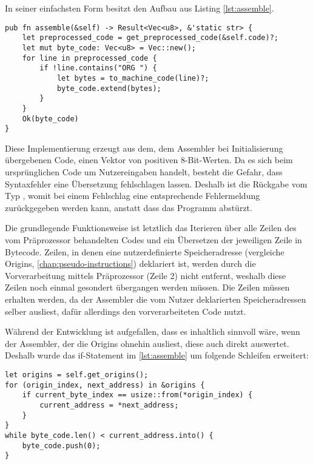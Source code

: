 In seiner einfachsten Form besitzt  den Aufbau aus Listing \ref{lst:assemble}.

\begin{listing}[ht]
\begin{verbatim}
pub fn assemble(&self) -> Result<Vec<u8>, &'static str> {
	let preprocessed_code = get_preprocessed_code(&self.code)?;
	let mut byte_code: Vec<u8> = Vec::new();
    for line in preprocessed_code {
        if !line.contains("ORG ") {
	        let bytes = to_machine_code(line)?;
            byte_code.extend(bytes);
        }
    }
    Ok(byte_code)
}
\end{verbatim}
\label{lst:assemble}
\end{listing}

Diese Implementierung erzeugt aus dem, dem Assembler bei Initialisierung übergebenen Code, einen Vektor von positiven 8-Bit-Werten. Da es sich beim ursprünglichen Code um Nutzereingaben handelt, besteht die Gefahr, dass Syntaxfehler eine Übersetzung fehlschlagen lassen. Deshalb ist die Rückgabe vom Typ , womit bei einem Fehlschlag eine entsprechende Fehlermeldung zurückgegeben werden kann, anstatt dass das Programm abstürzt.

Die grundlegende Funktionsweise ist letztlich das Iterieren über alle Zeilen des vom Präprozessor behandelten Codes und ein Übersetzen der jeweiligen Zeile in Bytecode. Zeilen, in denen eine nutzerdefinierte Speicheradresse (vergleiche Origins, \ref{chap:pseudo-instructions}) deklariert ist, werden durch die Vorverarbeitung mittels Präprozessor (Zeile 2) nicht entfernt, weshalb diese Zeilen noch einmal gesondert übergangen werden müssen. Die Zeilen müssen erhalten werden, da der Assembler die vom Nutzer deklarierten Speicheradressen selber ausliest, dafür allerdings den vorverarbeiteten Code nutzt.

Während der Entwicklung ist aufgefallen, dass es inhaltlich sinnvoll wäre, wenn der Assembler, der die Origins ohnehin ausliest, diese auch direkt auswertet. Deshalb wurde das if-Statement im \ref{lst:assemble} um folgende Schleifen erweitert:

\begin{listing}[ht]
\begin{verbatim}
let origins = self.get_origins();
for (origin_index, next_address) in &origins {
	if current_byte_index == usize::from(*origin_index) {
        current_address = *next_address;
    }
}
while byte_code.len() < current_address.into() {
    byte_code.push(0);
}
\end{verbatim}
\end{listing}

